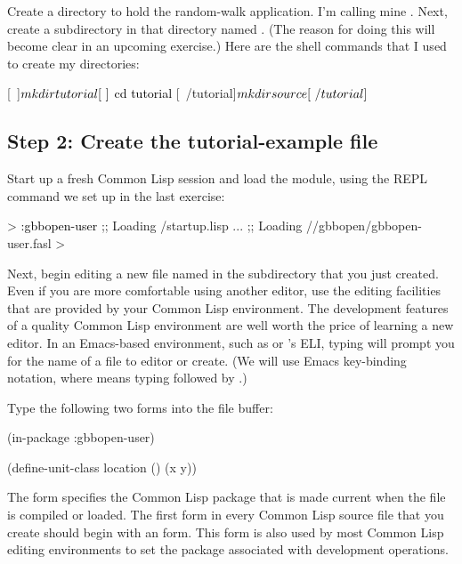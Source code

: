 \documentclass[10pt,twoside,english,pdftex]{article}
\begin{document}
Create a directory to hold the random-walk application.  I'm calling mine
.  Next, create a subdirectory in that directory named
.  (The reason for doing this will become clear in an upcoming
exercise.)  Here are the shell commands that I used to create my directories:
%
\begin{example}\color{darkergray}%
  [~]$ \textcolor{black}{mkdir tutorial}
  [~]$ \textcolor{black}{cd tutorial}
  [~/tutorial]$ \textcolor{black}{mkdir source}
  [~/tutorial]$ 
\end{example}

\subsection*{Step 2: Create the tutorial-example file}

Start up a fresh Common Lisp session and load the 
module, using the REPL command we set up in the last exercise:
%
\begin{example}\color{darkergray}%
  > \textcolor{black}{:gbbopen-user}
  ;; Loading /startup.lisp
     ...
  ;; Loading //gbbopen/gbbopen-user.fasl
  >
\end{example}

Next, begin editing a new file named  in
the  subdirectory that you just created.  Even if you are
more comfortable using another editor, use the editing facilities that
are provided by your Common Lisp environment.  The development
features of a quality Common Lisp environment are well worth the price
of learning a new editor.  In an Emacs-based environment, such as
 or
's ELI, typing  will prompt you for the name of a file to editor or create.
(We will use Emacs key-binding notation, where  means
typing  followed by {}.)  

Type the following two forms into the 
file buffer:
%
\begin{example}
  (in-package :gbbopen-user)

  (define-unit-class location ()
    (x y))
\end{example}

The  form specifies the Common Lisp package that is made
current when the file is compiled or loaded.  The first form in every Common
Lisp source file that you create should begin with an  form.
This form is also used by most Common Lisp editing environments to set the
package associated with development operations.
\end{document}
